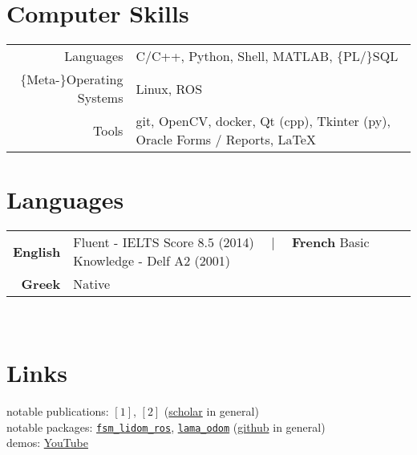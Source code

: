 \documentclass[a4paper,10pt,twoside]{article}
\begin{document}
\section{Computer Skills}

\begin{tabular}{rp{12cm}}
Languages & C/C++, Python, Shell, MATLAB, $\{$PL/$\}$SQL\\
$\{$Meta-$\}$Operating Systems & Linux, ROS \\
Tools & git, OpenCV, docker, Qt (cpp), Tkinter (py), Oracle Forms / Reports, \LaTeX\\
\end{tabular}%



\section{Languages}

\begin{tabular}{rp{12cm}}
\textbf{English} & Fluent - IELTS Score $8.5$ (2014) \ \ | \ \ \textbf{French} Basic Knowledge - Delf A2 (2001) \\
\textbf{Greek} & Native \\
\end{tabular} \\



\section{Links}

\noindent
notable publications: \href{https://www.sciencedirect.com/science/article/abs/pii/S0921889021002323}{$[1]$}, \href{https://ieeexplore.ieee.org/abstract/document/9981228}{$[2]$} (\href{https://scholar.google.com/citations?view\_op=list\_works\&hl=en\&user=9\_hI4hMAAAAJ}{scholar} in general) \\
notable packages: \href{https://github.com/li9i/fsm\_lidom\_ros}{\texttt{fsm\_lidom\_ros}}, \href{https://github.com/li9i/lama\_odom}{\texttt{lama\_odom}} (\href{https://github.com/li9i}{github} in general)\\
demos: \href{https://www.youtube.com/user/canhartt/videos}{YouTube}
\end{document}
